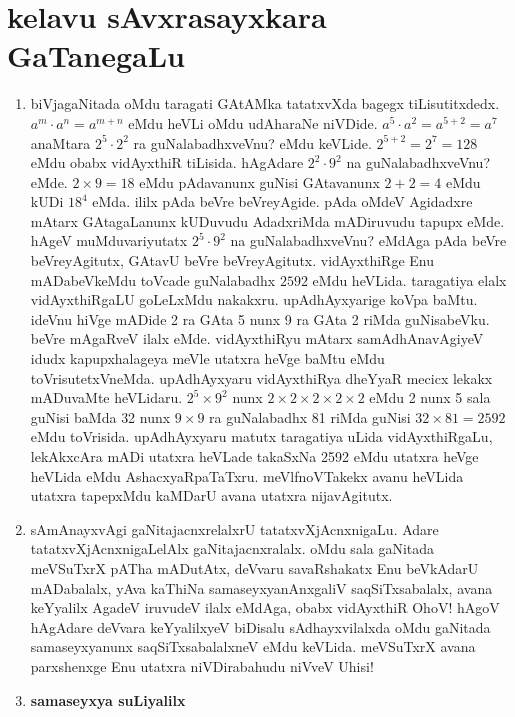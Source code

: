 \chapter{kelavu sAvxrasayxkara GaTanegaLu}

\begin{enumerate}[\rm 1)]
\item biVjagaNitada oMdu taragati GAtAMka tatatxvXda bagegx tiLisutitxdedx. $a^m\cdot a^n=a^{m+n}$ eMdu heVLi oMdu udAharaNe niVDide. $a^5\cdot a^2=a^{5+2}=a^7$ anaMtara $2^5\cdot 2^2$ ra guNalabadhxveVnu? eMdu keVLide. $2^{5+2}=2^7=128$ eMdu obabx vidAyxthiR tiLisida. hAgAdare $2^2\cdot 9^2$ na guNalabadhxveVnu? eMde. $2\times 9=18$ eMdu pAdavanunx guNisi GAtavanunx $2+2=4$ eMdu kUDi $18^4$ eMda. ililx pAda beVre beVreyAgide. pAda oMdeV Agidadxre mAtarx GAtagaLanunx kUDuvudu AdadxriMda mADiruvudu tapupx eMde. hAgeV muMduvariyutatx $2^5\cdot 9^2$ na guNalabadhxveVnu? eMdAga pAda beVre beVreyAgitutx, GAtavU beVre beVreyAgitutx. vidAyxthiRge Enu mADabeVkeMdu toVcade guNalabadhx $2592$ eMdu heVLida. taragatiya elalx vidAyxthiRgaLU goLeLxMdu nakakxru. upAdhAyxyarige koVpa baMtu. ideVnu hiVge mADide {\rm 2} ra GAta {\rm 5} nunx {\rm 9} ra GAta {\rm 2} riMda guNisabeVku. beVre mAgaRveV ilalx eMde. vidAyxthiRyu mAtarx samAdhAnavAgiyeV idudx kapupxhalageya meVle utatxra heVge baMtu eMdu toVrisutetxVneMda. upAdhAyxyaru vidAyxthiRya dheYyaR mecicx lekakx mADuvaMte heVLidaru. $2^5\times 9^2$ nunx $2\times 2\times 2\times 2\times 2$ eMdu {\rm 2} nunx {\rm 5} sala guNisi baMda {\rm 32} nunx $9\times 9$ ra guNalabadhx {\rm 81} riMda guNisi $32\times 81=2592$ eMdu toVrisida. upAdhAyxyaru matutx taragatiya uLida vidAyxthiRgaLu, lekAkxcAra mADi utatxra heVLade takaSxNa {\rm 2592} eMdu utatxra heVge heVLida eMdu AshacxyaRpaTaTxru. meVlfnoVTakekx avanu heVLida utatxra tapepxMdu kaMDarU avana utatxra nijavAgitutx.

\item sAmAnayxvAgi gaNitajacnxrelalxrU tatatxvXjAcnxnigaLu. Adare tatatxvXjAcnxnigaLelAlx gaNitajacnxralalx. oMdu sala gaNitada meVSuTxrX pATha mADutAtx, deVvaru savaRshakatx Enu beVkAdarU mADabalalx, yAva kaThiNa samaseyxyanAnxgaliV saqSiTxsabalalx, avana keYyalilx AgadeV iruvudeV ilalx eMdAga, obabx vidAyxthiR OhoV! hAgoV hAgAdare deVvara keYyalilxyeV biDisalu sAdhayxvilalxda oMdu gaNitada samaseyxyanunx saqSiTxsabalalxneV eMdu keVLida. meVSuTxrX avana parxshenxge Enu utatxra niVDirabahudu niVveV Uhisi!

\item \textbf{samaseyxya suLiyalilx}


\end{enumerate}
